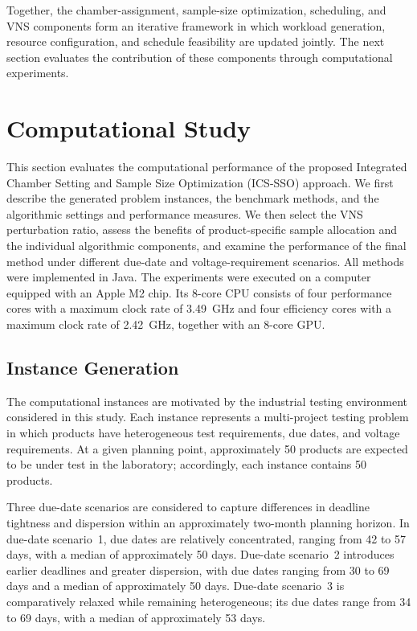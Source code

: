 \documentclass[11pt]{article}
\begin{document}
Together, the chamber-assignment, sample-size optimization, scheduling, and VNS components form an iterative framework in which workload generation, resource configuration, and schedule feasibility are updated jointly. The next section evaluates the contribution of these components through computational experiments.

\section{Computational Study}
\label{sec:computational_study}

This section evaluates the computational performance of the proposed Integrated Chamber Setting and Sample Size Optimization (ICS-SSO) approach. We first describe the generated problem instances, the benchmark methods, and the algorithmic settings and performance measures. We then select the VNS perturbation ratio, assess the benefits of product-specific sample allocation and the individual algorithmic components, and examine the performance of the final method under different due-date and voltage-requirement scenarios. All methods were implemented in Java. The experiments were executed on a computer equipped with an Apple M2 chip. Its 8-core CPU consists of four performance cores with a maximum clock rate of 3.49~GHz and four efficiency cores with a maximum clock rate of 2.42~GHz, together with an 8-core GPU.

\subsection{Instance Generation}
\label{subsec:exp_design}

The computational instances are motivated by the industrial testing environment considered in this study. Each instance represents a multi-project testing problem in which products have heterogeneous test requirements, due dates, and voltage requirements. At a given planning point, approximately 50 products are expected to be under test in the laboratory; accordingly, each instance contains 50 products.

Three due-date scenarios are considered to capture differences in deadline tightness and dispersion within an approximately two-month planning horizon. In due-date scenario~1, due dates are relatively concentrated, ranging from 42 to 57 days, with a median of approximately 50 days. Due-date scenario~2 introduces earlier deadlines and greater dispersion, with due dates ranging from 30 to 69 days and a median of approximately 50 days. Due-date scenario~3 is comparatively relaxed while remaining heterogeneous; its due dates range from 34 to 69 days, with a median of approximately 53 days.
\end{document}
